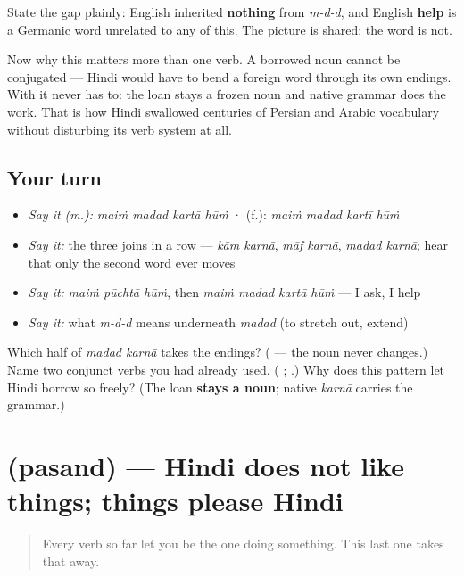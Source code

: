 State the gap plainly: English inherited \textbf{nothing} from \emph{m-d-d}, and English \textbf{help} is a Germanic word unrelated to any of this. The picture is shared; the word is not.

Now why this matters more than one verb. A borrowed noun cannot be conjugated — Hindi would have to bend a foreign word through its own endings. With \textbf{} it never has to: the loan stays a frozen noun and native grammar does the work. That is how Hindi swallowed centuries of Persian and Arabic vocabulary without disturbing its verb system at all.

\subsection*{Your turn}
\begin{itemize}
\raggedright
  \item \emph{Say it (m.):} \emph{maiṁ madad kartā hūṁ}  ·  (f.): \emph{maiṁ madad kartī hūṁ}
  \item \emph{Say it:} the three joins in a row — \emph{kām karnā}, \emph{māf karnā}, \emph{madad karnā}; hear that only the second word ever moves
  \item \emph{Say it:} \emph{maiṁ pūchtā hūṁ}, then \emph{maiṁ madad kartā hūṁ} — I ask, I help
  \item \emph{Say it:} what \emph{m-d-d} means underneath \emph{madad} (to stretch out, extend)
\end{itemize}

\begin{tcolorbox}[breakable,colback=teal!4,colframe=teal!35!black,title={Before you move on}]
Which half of \emph{madad karnā} takes the endings? (\textbf{} — the noun never changes.) Name two conjunct verbs you had already used. (\textbf{ }; \textbf{ }.) Why does this pattern let Hindi borrow so freely? (The loan \textbf{stays a noun}; native \emph{karnā} carries the grammar.)
\end{tcolorbox}
\section[\texorpdfstring{\hi{मुझे} … \hi{पसंद} \hi{है} (mujhe … pasand hai)}{मुझे … पसंद है (mujhe … pasand hai)}]{ (pasand) — Hindi does not like things; things please Hindi}

\label{lesson:HI-C35-pasand}



\begin{quote}
Every verb so far let you be the one doing something. This last one takes that away.
\end{quote}

